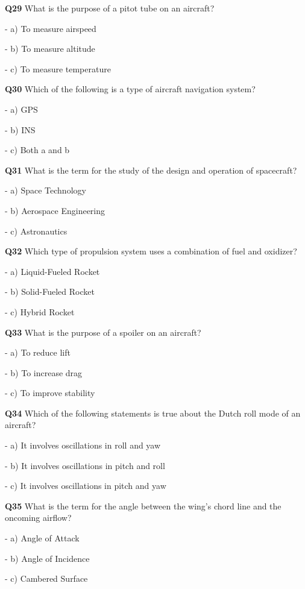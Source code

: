 \textbf{Q29} What is the purpose of a pitot tube on an aircraft?\par
\quad - a) To measure airspeed\par
\quad - b) To measure altitude\par
\quad - c) To measure temperature\par

\textbf{Q30} Which of the following is a type of aircraft navigation system?\par
\quad - a) GPS\par
\quad - b) INS\par
\quad - c) Both a and b\par

\textbf{Q31} What is the term for the study of the design and operation of spacecraft?\par
\quad - a) Space Technology\par
\quad - b) Aerospace Engineering\par
\quad - c) Astronautics\par

\textbf{Q32} Which type of propulsion system uses a combination of fuel and oxidizer?\par
\quad - a) Liquid-Fueled Rocket\par
\quad - b) Solid-Fueled Rocket\par
\quad - c) Hybrid Rocket\par

\textbf{Q33} What is the purpose of a spoiler on an aircraft?\par
\quad - a) To reduce lift\par
\quad - b) To increase drag\par
\quad - c) To improve stability\par

\textbf{Q34} Which of the following statements is true about the Dutch roll mode of an aircraft?\par
\quad - a) It involves oscillations in roll and yaw\par
\quad - b) It involves oscillations in pitch and roll\par
\quad - c) It involves oscillations in pitch and yaw\par

\textbf{Q35} What is the term for the angle between the wing's chord line and the oncoming airflow?\par
\quad - a) Angle of Attack\par
\quad - b) Angle of Incidence\par
\quad - c) Cambered Surface\par

